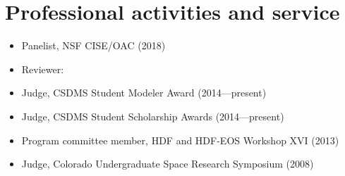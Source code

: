 \section{Professional activities and service}
\vspace{0.5em}

\begin{itemize}

  \item Panelist, NSF CISE/OAC (2018)

  \item Reviewer:

  \item Judge, CSDMS Student Modeler Award (2014---present)

  \item Judge, CSDMS Student Scholarship Awards (2014---present)

  \item Program committee member, HDF and HDF-EOS Workshop XVI (2013)

  \item Judge, Colorado Undergraduate Space Research Symposium (2008)

\end{itemize}
